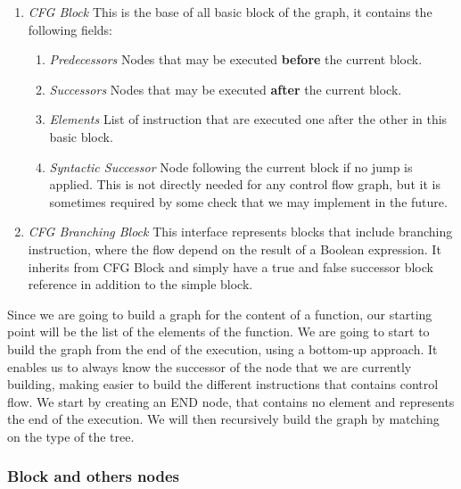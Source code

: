 \begin{enumerate}
	\item \textit{CFG Block} \newline 
	This is the base of all basic block of the graph, it contains the following fields:
	\begin{enumerate}
		\item \textit{Predecessors} \newline
		Nodes that may be executed \textbf{before} the current block.\newline
		\item \textit{Successors} \newline
		Nodes that may be executed \textbf{after} the current block.\newline
		\item \textit{Elements} \newline
		List of instruction that are executed one after the other in this basic block. \newline
		\item \textit{Syntactic Successor} \newline
		Node following the current block if no jump is applied. 
		This is not directly needed for any control flow graph, but it is sometimes required by some check that we may implement in the future.\newline
	\end{enumerate}
	\item \textit{CFG Branching Block} \newline 
	This interface represents blocks that include branching instruction, where the flow depend on the result of a Boolean expression. 
	It inherits from CFG Block and simply have a true and false successor block reference in addition to the simple block.
	\newline 
\end{enumerate}

Since we are going to build a graph for the content of a function, our starting point will be the list of the elements of the function.
We are going to start to build the graph from the end of the execution, using a bottom-up approach. It enables us to always know the successor of the node that we are currently building, making easier to build the different instructions that contains control flow.
We start by creating an END node, that contains no element and represents the end of the execution. We will then recursively build the graph by matching on the type of the tree.

\subsubsection{Block and others nodes}
\label{subsubsec:block_and_others}

